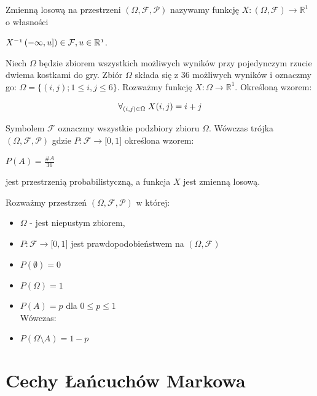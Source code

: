 \begin{definicja}
	Zmienną losową na przestrzeni $(\Omega, \mathcal{F}, \mathcal{P})$ nazywamy funkcję $X:  (\Omega, \mathcal{F}) \to \mathbb{R}^{1}$ o własności 
	\begin{center}
		$\mathnormal{ X^{-1} \left(  -\infty, u \rbrack
			\right) \in \mathcal{F}, u \in \mathbb{R}^{1}}$.
	\end{center}
\end{definicja}

\begin{przyklad}
	Niech $\Omega$ będzie zbiorem wszystkich możliwych wyników przy pojedynczym rzucie dwiema kostkami do gry. Zbiór $\Omega$ składa się z 36 możliwych wyników i oznaczmy go: $\Omega = \{ (i,j); 1 \le i,j \le 6 \} $. Rozważmy funkcję $X: \Omega \rightarrow \mathbb{R}^{1}$. Określoną wzorem:
 
		$$\forall_{(i,j) \in \Omega }\; \space \space X(i,j)=i+j $$
 	
	 Symbolem $\mathcal{F}$ oznaczmy wszystkie podzbiory zbioru $\Omega$. Wówczas trójka $(\Omega, \mathcal{F}, \mathcal{P})$ gdzie $P: \mathcal{F} \rightarrow \lbrack 0, 1 \rbrack$ określona wzorem:
	 \begin{center}
	 		$ P (A) = \frac{\#A}{36} $
	 \end{center}
	 jest przestrzenią probabilistyczną, a funkcja $X$ jest zmienną losową.
	  
\end{przyklad}

\begin{przyklad}
	Rozważmy przestrzeń $(\Omega, \mathcal{F}, \mathcal{P})$ w której:
	\begin{itemize}
		\item $\Omega$  - jest niepustym zbiorem,
		\item $P: \mathcal{F} \rightarrow \lbrack 0, 1 \rbrack$ jest prawdopodobieństwem na $(\Omega, \mathcal{F})$
		\item $P(\emptyset) = 0$
		\item $P(\Omega) = 1$
		\item $P(A) = p$ dla $0 \le p \le 1$ \\ \newline
		Wówczas:
		\item $P(\Omega \setminus A) = 1-p$
	\end{itemize}
\end{przyklad}



\section{Cechy Łańcuchów Markowa}

